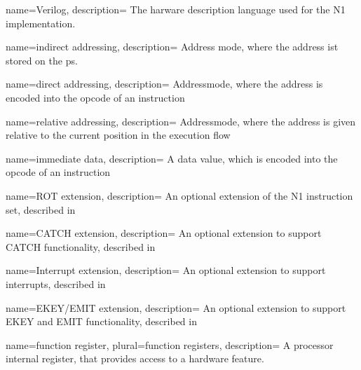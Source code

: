  {
    name={Verilog},
    description={
      The harware description language used for the N1 implementation.
      \nopostdesc
    }
}

 {
    name={indirect addressing},
    description={
    Address mode, where the address ist stored on the \gls{ps}.
    \nopostdesc
    }
}

 {
    name={direct addressing},
    description={
    Addressmode, where the address is encoded into the \gls{opcode} of
    an instruction
    \nopostdesc
    }
}

 {
    name={relative addressing},
    description={
    Addressmode, where the address is given relative to the current position
    in the execution flow
    \nopostdesc    
    }
}

 {
    name={immediate data},
    description={
    A data value, which is encoded into the \gls{opcode} of an instruction
    \nopostdesc    
    }
}

 {
    name={ROT extension},
    description={
    An optional extension of the N1 instruction set, described in 
    \nopostdesc    
    }
}

 {
    name={CATCH extension},
    description={
    An optional extension to support CATCH functionality, described in 
    \nopostdesc    
    }
}

 {
    name={Interrupt extension},
    description={
    An optional extension to support interrupts, described in 
    \nopostdesc    
    }
}

 {
    name={EKEY/EMIT extension},
    description={
    An optional extension to support EKEY and EMIT functionality, described in 
    \nopostdesc    
    }
}

 {
    name={function register},
    plural={function registers},
    description={
    A processor internal register, that provides access to a hardware feature.
    \nopostdesc    
    }
}


